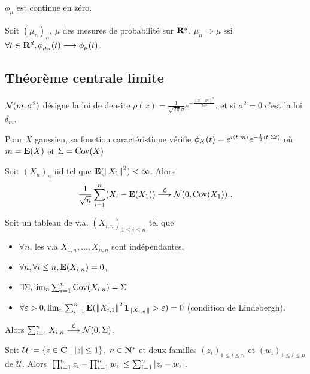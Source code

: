 	\begin{pop}
		$\phi_\mu$ est continue en zéro.
	\end{pop}

	\begin{thm}[de Lévy]
		Soit $(\mu_n)_n$, $\mu$ des mesures de probabilité sur $\mathbf{R}^d$.
		$\mu_n \Rightarrow \mu$ ssi $\forall t \in \mathbf{R}^d, \phi_{\mu_n}(t) \longrightarrow \phi_\mu(t)$.
	\end{thm}


\subsection{Théorème centrale limite}

	\begin{note}
		$\mathcal{N}(m,\sigma^2)$ désigne la loi de densite $\rho(x) = \frac{1}{\sqrt{2\pi} \sigma} e^{-\frac{(x - m)^2}{2 \sigma^2}}$, et si $\sigma^2 = 0$ c'est la loi $\delta_m$.
	\end{note}

	Pour $X$ gaussien, sa fonction caractéristique vérifie $\phi_X(t) = e^{i\left\langle t \mid m \right\rangle} e^{-\frac{1}{2} \left\langle t \mid \Sigma t \right\rangle}$ où $m = \mathbf{E}(X)$ et $\Sigma = \operatorname{Cov}(X)$.
	
	\begin{thm}
		Soit $(X_n)_n$ iid tel que $\mathbf{E}(\left\lVert X_1\right\rVert^2) < \infty$.
		Alors\\[-0.5em]
		$$\frac{1}{\sqrt{n}} \sum_{i = 1}^n (X_i - \esp(X_1)) \overset{\mathcal{L}}{\longrightarrow} \normale(0,\Cov(X_1))\ .$$
	\end{thm}
	
	\vspace{-0.4em}

	\begin{thm}
		Soit un tableau de v.a. $(X_{i,n})_{1 \leq i \leq n}$ tel que
		\begin{itemize}
			\item[\textbullet] $\forall n$, les v.a $X_{1,n},\ldots,X_{n,n}$ sont indépendantes,
			\item[\textbullet] $\forall n, \forall i \leq n, \mathbf{E}(X_{i,n}) = 0$,
			\item[\textbullet] $\exists \Sigma, \lim_n \sum_{i = 1}^n \operatorname{Cov}(X_{i,n}) = \Sigma$
			\item[\textbullet] $\forall \varepsilon > 0, \lim_n \sum_{i = 1}^n \mathbf{E}(\left\lVert X_{i,1}\right\rVert^2 \operatorname{\mathbf{1}}_{\left\lVert X_{i,n}\right\rVert} > \varepsilon) = 0$ (condition de Lindebergh).
		\end{itemize}
		Alors $\sum_{i = 1}^n X_{i,n} \overset{\mathcal{L}}{\longrightarrow} \mathcal{N}(0,\Sigma)$.
	\end{thm}
 
	\begin{lem}
		Soit $\mathcal{U} := \{ z \in \mathbf{C} \mid \left\lvert z\right\rvert \leq 1 \}$, $n \in \mathbf{N}^*$ et deux familles $(z_i)_{1 \leq i \leq n}$ et $(w_i)_{1 \leq i \leq n}$ de $\mathcal{U}$.
		Alors $\left\lvert \prod_{i = 1}^n z_i - \prod_{i = 1}^n w_i \right\rvert \leq \sum_{i = 1}^n \left\lvert z_i - w_i\right\rvert$.
	\end{lem}
